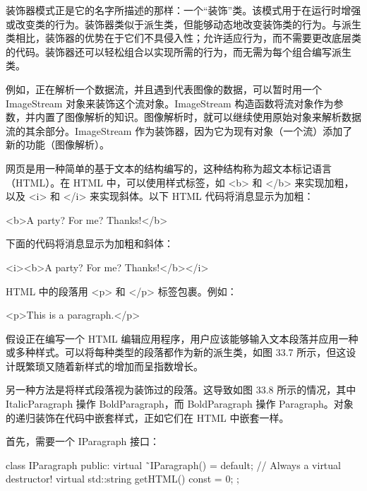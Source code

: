
装饰器模式正是它的名字所描述的那样：一个“装饰”类。该模式用于在运行时增强或改变类的行为。装饰器类似于派生类，但能够动态地改变装饰类的行为。与派生类相比，装饰器的优势在于它们不具侵入性；允许适应行为，而不需要更改底层类的代码。装饰器还可以轻松组合以实现所需的行为，而无需为每个组合编写派生类。

例如，正在解析一个数据流，并且遇到代表图像的数据，可以暂时用一个 ImageStream 对象来装饰这个流对象。ImageStream 构造函数将流对象作为参数，并内置了图像解析的知识。图像解析时，就可以继续使用原始对象来解析数据流的其余部分。ImageStream 作为装饰器，因为它为现有对象（一个流）添加了新的功能（图像解析）。


网页是用一种简单的基于文本的结构编写的，这种结构称为超文本标记语言（HTML）。在 HTML 中，可以使用样式标签，如 <b> 和 </b> 来实现加粗，以及 <i> 和 </i> 来实现斜体。以下 HTML 代码将消息显示为加粗：

\begin{shell}
<b>A party? For me? Thanks!</b>
\end{shell}

下面的代码将消息显示为加粗和斜体：

\begin{shell}
<i><b>A party? For me? Thanks!</b></i>
\end{shell}

HTML 中的段落用 <p> 和 </p> 标签包裹。例如：

\begin{shell}
<p>This is a paragraph.</p>
\end{shell}

假设正在编写一个 HTML 编辑应用程序，用户应该能够输入文本段落并应用一种或多种样式。可以将每种类型的段落都作为新的派生类，如图 33.7 所示，但这设计既繁琐又随着新样式的增加而呈指数增长。


另一种方法是将样式段落视为装饰过的段落。这导致如图 33.8 所示的情况，其中 ItalicParagraph 操作 BoldParagraph，而 BoldParagraph 操作 Paragraph。对象的递归装饰在代码中嵌套样式，正如它们在 HTML 中嵌套一样。



首先，需要一个 IParagraph 接口：

\begin{cpp}
class IParagraph
{
    public:
        virtual ˜IParagraph() = default; // Always a virtual destructor!
        virtual std::string getHTML() const = 0;
};
\end{cpp}

